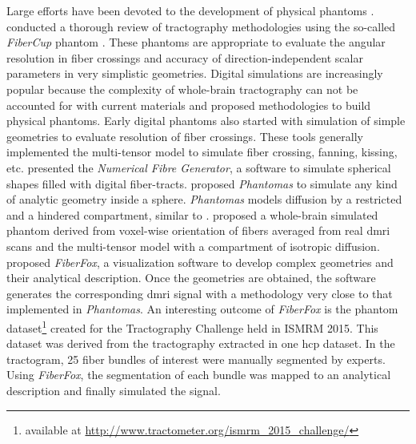 \documentclass[english]{frontiers/frontiersSCNS} %
\begin{document}
Large efforts have been devoted to the development of physical phantoms
  \citep{lin_validation_2001,campbell_flowbased_2005,perrin_validation_2005,fieremans_simulation_2008,tournier_resolving_2008}.
\cite{cote_tractometer_2013} conducted a thorough review of tractography methodologies using the
  so-called \emph{FiberCup} phantom \citep{poupon_new_2008,fillard_quantitative_2011}.
These phantoms are appropriate to evaluate the angular resolution in fiber crossings and accuracy of
  direction-independent scalar parameters in very simplistic geometries.
Digital simulations are increasingly popular because the complexity of whole-brain tractography
  can not be accounted for with current materials and proposed methodologies to build physical phantoms.
Early digital phantoms also started with simulation of simple geometries
  \citep{basser_in_2000,goessl_fiber_2002,tournier_limitations_2002,leemans_mathematical_2005}
  to evaluate resolution of fiber crossings.
These tools generally implemented the multi-tensor model \citep{alexander_analysis_2001,tuch_high_2002}
  to simulate fiber crossing, fanning, kissing, etc.
\cite{close_software_2009} presented the \emph{Numerical Fibre Generator}, a software to simulate
  spherical shapes filled with digital fiber-tracts.
\cite{caruyer_phantomas_2014} proposed \emph{Phantomas} to simulate any kind of analytic geometry
  inside a sphere.
\emph{Phantomas} models diffusion by a restricted and a hindered compartment, similar to
  \citep{assaf_composite_2005}.
\cite{wilkins_fiber_2014} proposed a whole-brain simulated phantom derived from voxel-wise orientation
  of fibers averaged from real \gls*{dmri} scans and the multi-tensor model with a compartment of
  isotropic diffusion.
\cite{neher_fiberfox_2014} proposed \emph{FiberFox}, a visualization software to develop
  complex geometries and their analytical description.
Once the geometries are obtained, the software generates the corresponding \gls*{dmri} signal with a
  methodology very close to that implemented in \emph{Phantomas}.
An interesting outcome of \emph{FiberFox} is the phantom dataset\footnote{available at
  \url{http://www.tractometer.org/ismrm_2015_challenge/}} created for the Tractography
  Challenge held in ISMRM 2015.
This dataset was derived from the tractography extracted in one \gls*{hcp} dataset.
In the tractogram, 25 fiber bundles of interest were manually segmented by experts.
Using \emph{FiberFox}, the segmentation of each bundle was mapped to an analytical
  description and finally simulated the signal.
\end{document}
